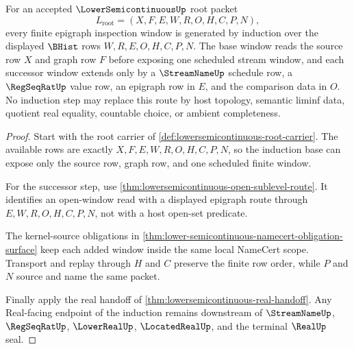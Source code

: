 \begin{theorem}
\label{thm:lowersemicontinuous-epigraph-window-induction}
For an accepted $\LowerSemicontinuousUp$ root packet
$$
L_{\mathrm{root}}=(X,F,E,W,R,O,H,C,P,N),
$$
every finite epigraph inspection window is generated by induction over the displayed $\BHist$ rows $W,R,E,O,H,C,P,N$. The base window reads the source row $X$ and graph row $F$ before exposing one scheduled stream window, and each successor window extends only by a $\StreamNameUp$ schedule row, a $\RegSeqRatUp$ value row, an epigraph row in $E$, and the comparison data in $O$. No induction step may replace this route by host topology, semantic liminf data, quotient real equality, countable choice, or ambient completeness.
\end{theorem}
\begin{proof}
Start with the root carrier of \autoref{def:lowersemicontinuous-root-carrier}. The available rows are exactly $X,F,E,W,R,O,H,C,P,N$, so the induction base can expose only the source row, graph row, and one scheduled finite window.

For the successor step, use \autoref{thm:lowersemicontinuous-open-sublevel-route}. It identifies an open-window read with a displayed epigraph route through $E,W,R,O,H,C,P,N$, not with a host open-set predicate.

The kernel-source obligations in \autoref{thm:lower-semicontinuous-namecert-obligation-surface} keep each added window inside the same local NameCert scope. Transport and replay through $H$ and $C$ preserve the finite row order, while $P$ and $N$ source and name the same packet.

Finally apply the real handoff of \autoref{thm:lowersemicontinuous-real-handoff}. Any Real-facing endpoint of the induction remains downstream of $\StreamNameUp$, $\RegSeqRatUp$, $\LowerRealUp$, $\LocatedRealUp$, and the terminal $\RealUp$ seal.
\end{proof}

